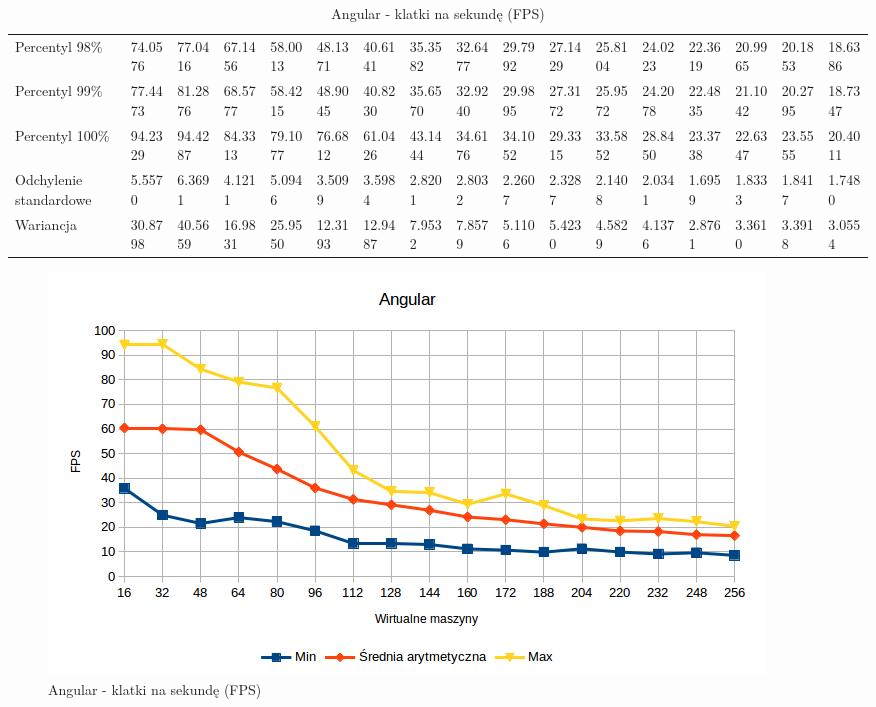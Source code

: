 \documentclass[polish, twoside, 12pt]{mwart}
\begin{document}
\begin{table}[]
{\begin{tabular}{lllllllllllllllll}
  Percentyl 98\%         & 74.0576 & 77.0416 & 67.1456 & 58.0013 & 48.1371 & 40.6141 & 35.3582 & 32.6477 & 29.7992 & 27.1429 & 25.8104 & 24.0223 & 22.3619 & 20.9965 & 20.1853 & 18.6386 \\
  Percentyl 99\%         & 77.4473 & 81.2876 & 68.5777 & 58.4215 & 48.9045 & 40.8230 & 35.6570 & 32.9240 & 29.9895 & 27.3172 & 25.9572 & 24.2078 & 22.4835 & 21.1042 & 20.2795 & 18.7347 \\
  Percentyl 100\%        & 94.2329 & 94.4287 & 84.3313 & 79.1077 & 76.6812 & 61.0426 & 43.1444 & 34.6176 & 34.1052 & 29.3315 & 33.5852 & 28.8450 & 23.3738 & 22.6347 & 23.5555 & 20.4011 \\
  Odchylenie standardowe & 5.5570  & 6.3691  & 4.1211  & 5.0946  & 3.5099  & 3.5984  & 2.8201  & 2.8032  & 2.2607  & 2.3287  & 2.1408  & 2.0341  & 1.6959  & 1.8333  & 1.8417  & 1.7480  \\
  Wariancja              & 30.8798 & 40.5659 & 16.9831 & 25.9550 & 12.3193 & 12.9487 & 7.9532  & 7.8579  & 5.1106  & 5.4230  & 4.5829  & 4.1376  & 2.8761  & 3.3610  & 3.3918  & 3.0554 
  \end{tabular}%
  }
  \caption{Angular - klatki na sekundę (FPS)}
  \label{tab:angular-fps}
\end{table}

\begin{figure}[ht]
  \includegraphics[width=\textwidth]{angular-fps.jpg}
  \caption{Angular - klatki na sekundę (FPS)}
  \label{fig:angular-fps}
\end{figure}
\end{document}
